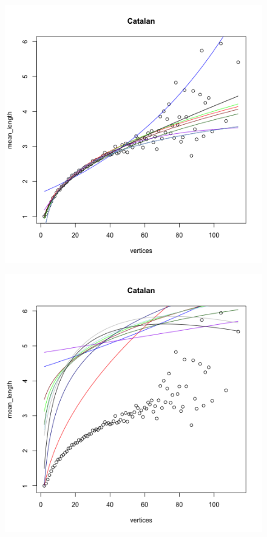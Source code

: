 \documentclass[paper=a4, fontsize=11pt]{scrartcl} %
\begin{document}
\begin{figure}
\begin{minipage}{\textwidth}
\begin{minipage}{.5\textwidth}
  \label{fig:cat2}
\end{minipage}
\centering
\begin{minipage}{.5\textwidth}
  \centering
  \includegraphics[width=\linewidth]{Mean_Catalan3}
  \label{fig:cat3}
\end{minipage}%
\begin{minipage}{.5\textwidth}
  \centering
  \includegraphics[width=\linewidth]{Mean_Catalan4}

\end{minipage}
\end{minipage}
\end{figure}
\end{document}
